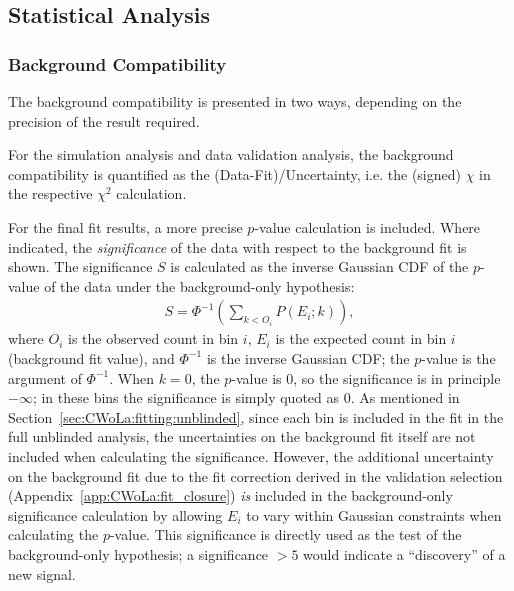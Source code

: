 \subsection{Statistical Analysis}
\label{sec:CWoLa:statanalysis}

\subsubsection{Background Compatibility}
The background compatibility is presented in two ways, depending on the precision of the result required.

For the simulation analysis and data validation analysis, the background compatibility is quantified as the (Data-Fit)/Uncertainty, i.e. the (signed) $\chi$ in the respective $\chi^2$ calculation.

For the final fit results, a more precise $p$-value calculation is included.
Where indicated, the \textit{significance} of the data with respect to the background fit is shown.
The significance $S$ is calculated as the inverse Gaussian CDF of the $p$-value of the data under the background-only hypothesis:
\begin{align}
  S = \Phi^{-1}\left(\sum_{k<O_i} P(E_i;k)\right),
  \label{eqn:CWoLa:significance_def}
\end{align}
where $O_i$ is the observed count in bin $i$, $E_i$ is the expected count in bin $i$ (background fit value), and $\Phi^{-1}$ is the inverse Gaussian CDF; the $p$-value is the argument of $\Phi^{-1}$.
When $k=0$, the $p$-value is $0$, so the significance is in principle $-\infty$; in these bins the significance is simply quoted as $0$.
As mentioned in Section~\ref{sec:CWoLa:fitting:unblinded}, since each bin is included in the fit in the full unblinded analysis, the uncertainties on the background fit itself are not included when calculating the significance.
However, the additional uncertainty on the background fit due to the fit correction derived in the validation selection (Appendix~\ref{app:CWoLa:fit_closure}) \textit{is} included in the background-only significance calculation by allowing $E_i$ to vary within Gaussian constraints when calculating the $p$-value.
This significance is directly used as the test of the background-only hypothesis; a significance $>5$ would indicate a ``discovery'' of a new signal.

